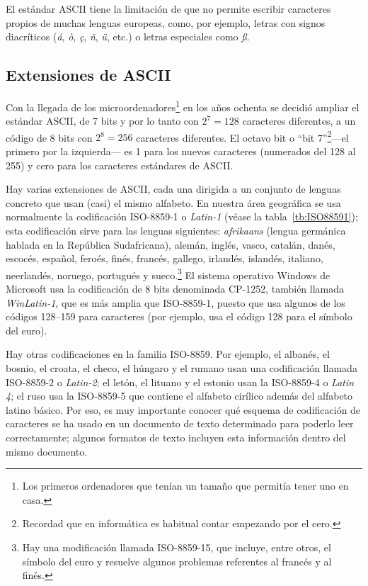El estándar ASCII tiene la limitación de que no permite escribir caracteres propios de muchas lenguas europeas, como, por ejemplo, letras con signos diacríticos (\emph{á}, \emph{ò}, \emph{ç}, \emph{ñ}, \emph{ü}, etc.) o letras especiales como \emph{ß}. 

\subsection{Extensiones de ASCII} \label{s3:ISO} Con la llegada de los microordenadores\footnote{Los primeros ordenadores que tenían un tamaño que permitía tener uno en casa.} en los años ochenta se decidió ampliar el estándar ASCII, de 7 bits y por lo tanto con $2^7=128$ caracteres diferentes, a un código de 8 bits con $2^8=256$ caracteres diferentes. El octavo bit o ``bit 7''\footnote{Recordad que en informática es habitual contar empezando por el cero.}---el primero por la izquierda--- es 1 para los nuevos caracteres (numerados del 128 al 255) y cero para los caracteres estándares de ASCII. 

Hay varias extensiones de ASCII, cada una dirigida a un conjunto de lenguas concreto que usan (casi) el mismo alfabeto. En nuestra área geográfica se usa normalmente la codificación ISO-8859-1 o \emph{Latin-1} (véase la tabla~\ref{tb:ISO88591}); esta codificación sirve para las lenguas siguientes: \emph{afrikaans} (lengua germánica hablada en la República Sudafricana), alemán, inglés, vasco, catalán, danés, escocés, español, feroés, finés, francés, gallego, irlandés, islandés, italiano, neerlandés, noruego, portugués y sueco.\footnote{Hay una modificación llamada ISO-8859-15, que incluye, entre otros, el símbolo del euro y resuelve algunos problemas referentes al francés y al finés.} El sistema operativo Windows de Microsoft usa la codificación de 8 bits denominada CP-1252, también llamada \emph{WinLatin-1}, que es más amplia que ISO-8859-1, puesto que usa algunos de los códigos 128--159 para caracteres (por ejemplo, usa el código 128 para el símbolo del euro). 

Hay otras codificaciones en la familia ISO-8859. Por ejemplo, el albanés, el bosnio, el croata, el checo, el húngaro y el rumano usan una codificación llamada ISO-8859-2 o \emph{Latin-2}; el letón, el lituano y el estonio usan la ISO-8859-4 o \emph{Latin 4}; el ruso usa la ISO-8859-5 que contiene el alfabeto cirílico además del alfabeto latino básico. Por eso, es muy importante conocer qué esquema de codificación de caracteres se ha usado en un documento de texto determinado para poderlo leer correctamente; algunos formatos de texto incluyen esta información dentro del mismo documento. 

